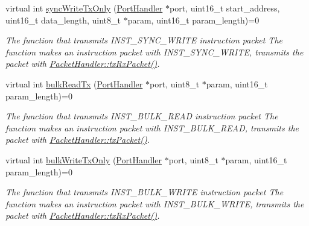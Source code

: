 \begin{DoxyCompactItemize}
virtual int \hyperlink{classmercury_1_1_packet_handler_aa4c16ce358c78638f49f6dc1b5b141bd}{sync\+Write\+Tx\+Only} (\hyperlink{classmercury_1_1_port_handler}{Port\+Handler} $\ast$port, uint16\+\_\+t start\+\_\+address, uint16\+\_\+t data\+\_\+length, uint8\+\_\+t $\ast$param, uint16\+\_\+t param\+\_\+length)=0
\begin{DoxyCompactList}\small\item\em The function that transmits I\+N\+S\+T\+\_\+\+S\+Y\+N\+C\+\_\+\+W\+R\+I\+TE instruction packet  The function makes an instruction packet with I\+N\+S\+T\+\_\+\+S\+Y\+N\+C\+\_\+\+W\+R\+I\+TE,  transmits the packet with \hyperlink{classmercury_1_1_packet_handler_ac7ceeaec210827d119199144badaad3a}{Packet\+Handler\+::tx\+Rx\+Packet()}. \end{DoxyCompactList}\item 
virtual int \hyperlink{classmercury_1_1_packet_handler_a88c18487119394e45537098716cbf6af}{bulk\+Read\+Tx} (\hyperlink{classmercury_1_1_port_handler}{Port\+Handler} $\ast$port, uint8\+\_\+t $\ast$param, uint16\+\_\+t param\+\_\+length)=0
\begin{DoxyCompactList}\small\item\em The function that transmits I\+N\+S\+T\+\_\+\+B\+U\+L\+K\+\_\+\+R\+E\+AD instruction packet  The function makes an instruction packet with I\+N\+S\+T\+\_\+\+B\+U\+L\+K\+\_\+\+R\+E\+AD,  transmits the packet with \hyperlink{classmercury_1_1_packet_handler_acc3f84f0d952dc2d827d8500de512abe}{Packet\+Handler\+::tx\+Packet()}. \end{DoxyCompactList}\item 
virtual int \hyperlink{classmercury_1_1_packet_handler_a43bc93f4a1305ae3aea45f67404d8b6d}{bulk\+Write\+Tx\+Only} (\hyperlink{classmercury_1_1_port_handler}{Port\+Handler} $\ast$port, uint8\+\_\+t $\ast$param, uint16\+\_\+t param\+\_\+length)=0
\begin{DoxyCompactList}\small\item\em The function that transmits I\+N\+S\+T\+\_\+\+B\+U\+L\+K\+\_\+\+W\+R\+I\+TE instruction packet  The function makes an instruction packet with I\+N\+S\+T\+\_\+\+B\+U\+L\+K\+\_\+\+W\+R\+I\+TE,  transmits the packet with \hyperlink{classmercury_1_1_packet_handler_ac7ceeaec210827d119199144badaad3a}{Packet\+Handler\+::tx\+Rx\+Packet()}. \end{DoxyCompactList}\end{DoxyCompactItemize}
